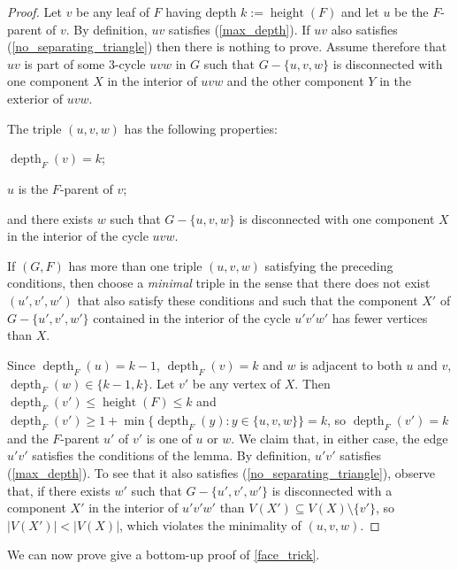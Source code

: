 \documentclass{patmorin}
\DeclareMathOperator{\height}{height}
\DeclareMathOperator{\depth}{depth}
\begin{document}
\begin{proof}
  Let $v$ be any leaf of $F$ having depth $k:=\height(F)$ and let $u$ be the $F$-parent of $v$.  By definition, $uv$ satisfies (\ref{max_depth}).  If $uv$ also satisfies (\ref{no_separating_triangle}) then there is nothing to prove.  Assume therefore that $uv$ is part of some $3$-cycle $uvw$ in $G$ such that $G-\{u,v,w\}$ is disconnected with one component $X$ in the interior of $uvw$ and the other component $Y$ in the exterior of $uvw$.

  The triple $(u,v,w)$ has the following properties:
  \begin{inparaenum}[(a)]
      \item $\depth_F(v)=k$;
      \item $u$ is the $F$-parent of $v$;
      \item and there exists $w$ such that $G-\{u,v,w\}$ is disconnected with one component $X$ in the interior of the cycle $uvw$.
  \end{inparaenum}
  If $(G,F)$ has more than one triple $(u,v,w)$ satisfying the preceding conditions, then choose a \emph{minimal} triple in the sense that there does not exist $(u',v',w')$ that also satisfy these conditions and such that the component $X'$ of $G-\{u',v',w'\}$ contained in the interior of the cycle $u'v'w'$ has fewer vertices than $X$.

  Since $\depth_F(u)=k-1$, $\depth_F(v)=k$ and $w$ is adjacent to both $u$ and $v$, $\depth_{F}(w)\in\{k-1,k\}$.
  Let $v'$ be any vertex of $X$. Then $\depth_F(v')\le\height(F)\le k$ and $\depth_F(v')\ge 1+\min\{\depth_F(y):y\in\{u,v,w\}\}=k$, so $\depth_{F}(v')=k$ and the $F$-parent $u'$ of $v'$ is one of $u$ or $w$.  We claim that, in either case, the edge $u'v'$ satisfies the conditions of the lemma.  By definition, $u'v'$ satisfies (\ref{max_depth}).  To see that it also satisfies (\ref{no_separating_triangle}), observe that, if there exists $w'$ such that $G-\{u',v',w'\}$ is disconnected with a component $X'$ in the interior of $u'v'w'$ than $V(X')\subseteq V(X)\setminus\{v'\}$, so $|V(X')|<|V(X)|$, which violates the minimality of $(u,v,w)$.
\end{proof}

We can now prove give a bottom-up proof of \cref{face_trick}.
\end{document}
